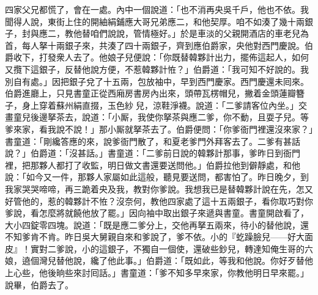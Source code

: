 四家父兄都慌了，會在一處。內中一個說道：「也不消再央吳千戶，他也不依。我聞得人說，東街上住的開紬絹鋪應大哥兄弟應二，和他契厚。咱不如湊了幾十兩銀子，封與應二，教他替咱們說說，管情極好。」於是車淡的父親開酒店的車老兒為首，每人拏十兩銀子來，共湊了四十兩銀子，齊到應伯爵家，央他對西門慶說。伯爵收下，打發衆人去了。他娘子兒便說：「你既替韓夥計出力，擺佈這起人，如何又攬下這銀子，反替他說方便，不惹韓夥計恠？」伯爵道：「我可知不好說的。我別自有處。」因把銀子兌了十五兩，包放袖中，早到西門慶家。西門慶還未囘來。伯爵進廳上，只見書童正從西廂房書房內出來，頭帶瓦楞帽兒，撇着金頭蓮瓣簪子，身上穿着蘇州絹直掇，玉色紗𧜽兒，涼鞋淨襪。說道：「二爹請客位內坐。」交畫童兒後邊拏茶去，說道：「小厮，我使你拏茶與應二爹，你不動，且耍子兒。等爹來家，看我說不說！」那小厮就拏茶去了。伯爵便問：「你爹衙門裡還沒來家？」書童道：「剛纔答應的來，說爹衙門散了，和夏老爹門外拜客去了。二爹有甚話說？」伯爵道：「沒甚話。」書童道：「二爹前日說的韓夥計那事，爹昨日到衙門裡，把那夥人都打了收監，明日做文書還要送問他。」伯爵拉他到僻靜處，和他說：「如今又一件，那夥人家屬如此這般，聽見要送問，都害怕了。昨日晚夕，到我家哭哭啼啼，再三跪着央及我，教對你爹說。我想我已是替韓夥計說在先，怎又好管他的，惹的韓夥計不恠？沒奈何，教他四家處了這十五兩銀子，看你取巧對你爹說，看怎麼將就饒他放了罷。」因向袖中取出銀子來遞與書童。書童開啟看了，大小四錠零四塊。說道：「既是應二爹分上，交他再拏五兩來，待小的替他說，還不知爹肯不肯。昨日吳大舅親自來和爹說了，爹不依。小的『虼躁臉兒——好大面皮』！實對二爹說，小的這銀子，不獨自一個使，還破些鈔兒，轉達知俺生哥的六娘，遶個灣兒替他說，纔了他此事。」{}伯爵道：「既如此，等我和他說。你好歹替他上心些，他後晌些來討囘話。」書童道：「爹不知多早來家，你教他明日早來罷。」說畢，伯爵去了。

